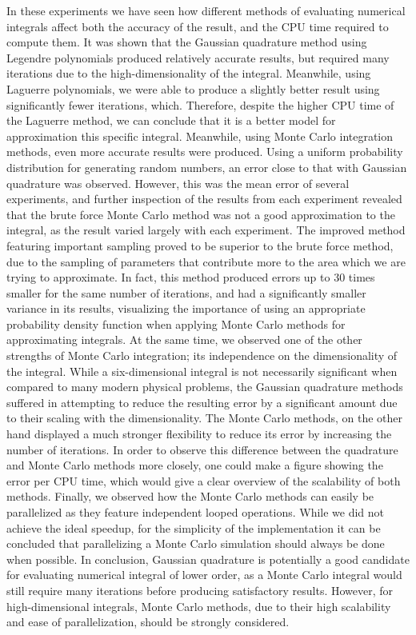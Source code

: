 \documentclass[a4paper,10pt,english]{article}
\begin{document}
In these experiments we have seen how different methods of evaluating numerical integrals affect both the accuracy of the result, and the CPU time required to compute them. It was shown that the Gaussian quadrature method using Legendre polynomials produced relatively accurate results, but required many iterations due to the high-dimensionality of the integral. Meanwhile, using Laguerre polynomials, we were able to produce a slightly better result using significantly fewer iterations, which. Therefore, despite the higher CPU time of the Laguerre method, we can conclude that it is a better model for approximation this specific integral. Meanwhile, using Monte Carlo integration methods, even more accurate results were produced. Using a uniform probability distribution for generating random numbers, an error close to that with Gaussian quadrature was observed. However, this was the mean error of several experiments, and further inspection of the results from each experiment revealed that the brute force Monte Carlo method was not a good approximation to the integral, as the result varied largely with each experiment. The improved method featuring important sampling proved to be superior to the brute force method, due to the sampling of parameters that contribute more to the area which we are trying to approximate. In fact, this method produced errors up to 30 times smaller for the same number of iterations, and had a significantly smaller variance in its results, visualizing the importance of using an appropriate probability density function when applying Monte Carlo methods for approximating integrals. At the same time, we observed one of the other strengths of Monte Carlo integration; its independence on the dimensionality of the integral. While a six-dimensional integral is not necessarily significant when compared to many modern physical problems, the Gaussian quadrature methods suffered in attempting to reduce the resulting error by a significant amount due to their scaling with the dimensionality. The Monte Carlo methods, on the other hand displayed a much stronger flexibility to reduce its error by increasing the number of iterations. In order to observe this difference between the quadrature and Monte Carlo methods more closely, one could make a figure showing the error per CPU time, which would give a clear overview of the scalability of both methods. Finally, we observed how the Monte Carlo methods can easily be parallelized as they feature independent looped operations. While we did not achieve the ideal speedup, for the simplicity of the implementation it can be concluded that parallelizing a Monte Carlo simulation should always be done when possible. In conclusion, Gaussian quadrature is potentially a good candidate for evaluating numerical integral of lower order, as a Monte Carlo integral would still require many iterations before producing satisfactory results. However, for high-dimensional integrals, Monte Carlo methods, due to their high scalability and ease of parallelization, should be strongly considered. 


\printbibliography
\end{document}
